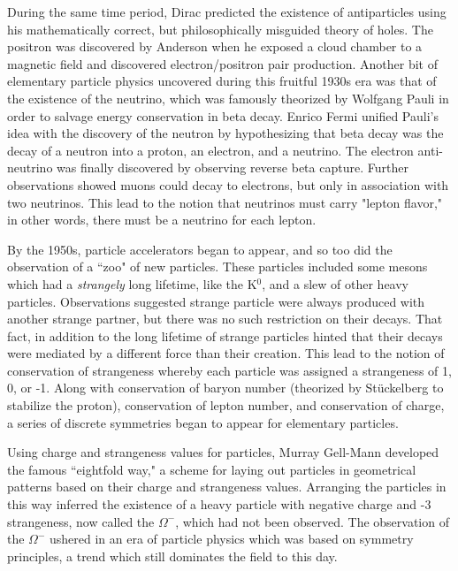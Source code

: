    During the same time period, Dirac predicted the existence of antiparticles using his mathematically correct, but philosophically misguided theory of holes. The positron was discovered by Anderson when he exposed a cloud chamber to a magnetic field and discovered electron/positron pair production. Another bit of elementary particle physics uncovered during this fruitful 1930s era was that of the existence of the neutrino, which was famously theorized by Wolfgang Pauli in order to salvage energy conservation in beta decay. Enrico Fermi unified Pauli's idea with the discovery of the neutron by hypothesizing that beta decay was the decay of a neutron into a proton, an electron, and a neutrino. The electron anti-neutrino was finally discovered by observing reverse beta capture. Further observations showed muons could decay to electrons, but only in association with two neutrinos. This lead to the notion that neutrinos must carry "lepton flavor," in other words, there must be a neutrino for each lepton.

   By the 1950s, particle accelerators began to appear, and so too did the observation of a ``zoo" of new particles. These particles included some mesons which had a \emph{strangely} long lifetime, like the K$^0$, and a slew of other heavy particles. Observations suggested strange particle were always produced with another strange partner, but there was no such restriction on their decays. That fact, in addition to the long lifetime of strange particles hinted that their decays were mediated by a different force than their creation. This lead to the notion of conservation of strangeness whereby each particle was assigned a strangeness of 1, 0, or -1. Along with conservation of baryon number (theorized by Stückelberg to stabilize the proton), conservation of lepton number, and conservation of charge, a series of discrete symmetries began to appear for elementary particles. 

   Using charge and strangeness values for particles, Murray Gell-Mann developed the famous ``eightfold way," a scheme for laying out particles in geometrical patterns based on their charge and strangeness values. Arranging the particles in this way inferred the existence of a heavy particle with negative charge and -3 strangeness, now called the $\Omega^-$, which had not been observed. The observation of the $\Omega^-$ ushered in an era of particle physics which was based on symmetry principles, a trend which still dominates the field to this day.

